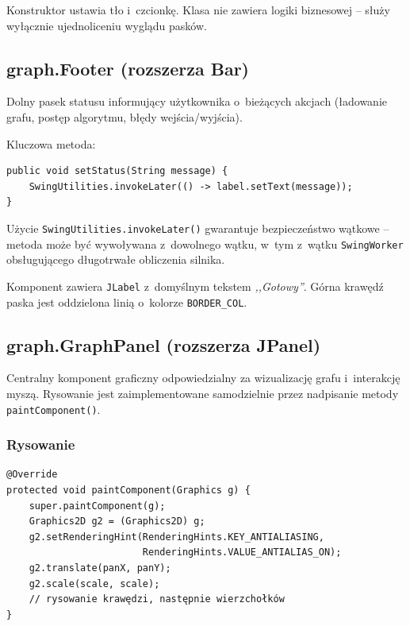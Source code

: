 \documentclass[12pt]{article}
\begin{document}
Konstruktor ustawia tło i~czcionkę. Klasa nie zawiera logiki biznesowej --
służy wyłącznie ujednoliceniu wyglądu pasków.


\subsection{graph.Footer (rozszerza Bar)}

Dolny pasek statusu informujący użytkownika o~bieżących akcjach
(ładowanie grafu, postęp algorytmu, błędy wejścia/wyjścia).

Kluczowa metoda:
\begin{lstlisting}
public void setStatus(String message) {
    SwingUtilities.invokeLater(() -> label.setText(message));
}
\end{lstlisting}

Użycie \texttt{SwingUtilities.invokeLater()} gwarantuje bezpieczeństwo
wątkowe -- metoda może być wywoływana z~dowolnego wątku, w~tym z~wątku
\texttt{SwingWorker} obsługującego długotrwałe obliczenia silnika.

Komponent zawiera \texttt{JLabel} z~domyślnym tekstem \emph{,,Gotowy''}.
Górna krawędź paska jest oddzielona linią o~kolorze \texttt{BORDER\_COL}.


\subsection{graph.GraphPanel (rozszerza JPanel)}

Centralny komponent graficzny odpowiedzialny za wizualizację grafu
i~interakcję myszą. Rysowanie jest zaimplementowane samodzielnie przez
nadpisanie metody \texttt{paintComponent()}.

\subsubsection{Rysowanie}

\begin{lstlisting}
@Override
protected void paintComponent(Graphics g) {
    super.paintComponent(g);
    Graphics2D g2 = (Graphics2D) g;
    g2.setRenderingHint(RenderingHints.KEY_ANTIALIASING,
                        RenderingHints.VALUE_ANTIALIAS_ON);
    g2.translate(panX, panY);
    g2.scale(scale, scale);
    // rysowanie krawędzi, następnie wierzchołków
}
\end{lstlisting}
\end{document}

